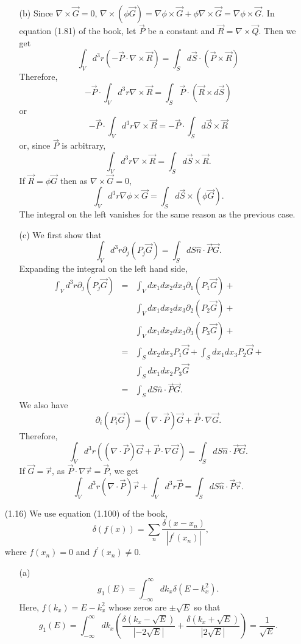 \documentclass{article}
\begin{document}
\begin{enumerate}
\begin{enumerate}
\item[(b)] Since $\nabla\times\vec{G} = 0$, $\nabla\times(\phi\vec{G}) = 
\nabla\phi\times\vec{G} + \phi\nabla\times\vec{G} = \nabla\phi\times\vec{G}$. 
In equation (1.81) of the book, let $\vec{P}$ be a constant and $\vec{R} =
\nabla\times\vec{Q}$. Then we get
\[
\int_V d^3r (-\vec{P}\cdot\nabla\times\vec{R}) = 
\int_Sd\vec{S}\cdot(\vec{P} \times \vec{R})
\]
Therefore,
\[
-\vec{P}\cdot\int_V d^3r \nabla\times\vec{R} = 
\int_S\vec{P}\cdot(\vec{R}\times d\vec{S})
\]
or
\[
-\vec{P}\cdot\int_V d^3r \nabla\times\vec{R} = 
-\vec{P}\cdot\int_S d\vec{S} \times \vec{R}
\]
or, since $\vec{P}$ is arbitrary,
\begin{equation}\label{e2}
\int_V d^3r \nabla\times\vec{R} = \int_S d\vec{S} \times \vec{R}.
\end{equation}
If $\vec{R} = \phi\vec{G}$ then as $\nabla\times\vec{G} = 0$,
\[
\int_V d^3r\nabla\phi\times\vec{G} = \int_S d\vec{S} \times (\phi\vec{G}).
\]
The integral on the left vanishes for the same reason as the previous case.

\item[(c)] We first show that 
\begin{equation}\label{e3}
\int_V d^3r \partial_j(P_j\vec{G}) = \int_S dS\hat{n}\cdot\vec{P}\vec{G}.
\end{equation}
Expanding the integral on the left hand side,
\begin{eqnarray*}
\int_V d^3r \partial_j(P_j\vec{G}) &=& \int_V dx_1dx_2dx_3\partial_1(P_1\vec{G}) + \\
 & & \int_V dx_1dx_2dx_3\partial_2(P_2\vec{G}) + \\
 & & \int_V dx_1dx_2dx_3\partial_3(P_3\vec{G}) + \\
 &=& \int_Sdx_2dx_3 P_1\vec{G} + \int_Sdx_1dx_3 P_2\vec{G} + \\
 & & \int_Sdx_1dx_2 P_3\vec{G} \\
 &=& \int_S dS\hat{n}\cdot\vec{P}\vec{G}.
\end{eqnarray*}
We also have
\[
\partial_i(P_i\vec{G}) = (\nabla\cdot\vec{P})\vec{G} + \vec{P}\cdot\nabla\vec{G}.
\]
Therefore,
\[
\int_V d^3r \left((\nabla\cdot\vec{P})\vec{G} + \vec{P}\cdot\nabla\vec{G}\right) =
\int_S dS\hat{n}\cdot\vec{P}\vec{G}.
\]
If $\vec{G} = \vec{r}$, as $\vec{P}\cdot\nabla\vec{r} = \vec{P}$, we get
\[
\int_V d^3r (\nabla\cdot\vec{P})\vec{r} + \int_V d^3r \vec{P} =
\int_S dS\hat{n}\cdot\vec{P}\vec{r}.
\]
\end{enumerate}

\item[(1.16)] We use equation (1.100) of the book, 
\[
\delta(f(x)) = \sum_{n}\frac{\delta(x - x_n)}{|f^\prime(x_n)|},
\]
where $f(x_n) = 0$ and $f^\prime(x_n) \ne 0$.
\begin{enumerate}
\item[(a)] 
\[
g_1(E) = \int_{-\infty}^\infty dk_x\delta(E - k_x^2).
\]
Here, $f(k_x) = E - k_x^2$ whose zeros are $\pm\sqrt{E}$ so that
\[
g_1(E) = \int_{-\infty}^\infty dk_x\left(\frac{\delta(k_x - \sqrt{E})}{|-2\sqrt{E}|}
+ \frac{\delta(k_x + \sqrt{E})}{|2\sqrt{E}|}\right) = \frac{1}{\sqrt{E}}.
\]


\end{enumerate}
\end{enumerate}
\end{document}
